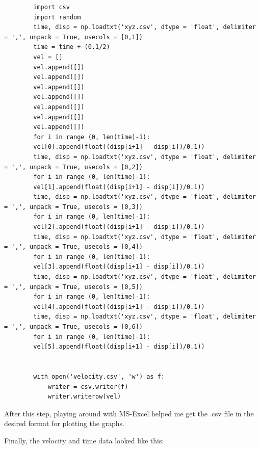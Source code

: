 \documentclass{article}
\begin{document}
	 \begin{lstlisting}
	 	import csv
	 	import random
	 	time, disp = np.loadtxt('xyz.csv', dtype = 'float', delimiter = ',', unpack = True, usecols = [0,1])
	 	time = time + (0.1/2)
	 	vel = []
	 	vel.append([])
	 	vel.append([])
	 	vel.append([])
	 	vel.append([])
	 	vel.append([])
	 	vel.append([])
	 	vel.append([])
	 	for i in range (0, len(time)-1):
	 	vel[0].append(float((disp[i+1] - disp[i])/0.1))
	 	time, disp = np.loadtxt('xyz.csv', dtype = 'float', delimiter = ',', unpack = True, usecols = [0,2])
	 	for i in range (0, len(time)-1):
	 	vel[1].append(float((disp[i+1] - disp[i])/0.1))
	 	time, disp = np.loadtxt('xyz.csv', dtype = 'float', delimiter = ',', unpack = True, usecols = [0,3])
	 	for i in range (0, len(time)-1):
	 	vel[2].append(float((disp[i+1] - disp[i])/0.1))
	 	time, disp = np.loadtxt('xyz.csv', dtype = 'float', delimiter = ',', unpack = True, usecols = [0,4])
	 	for i in range (0, len(time)-1):
	 	vel[3].append(float((disp[i+1] - disp[i])/0.1))
	 	time, disp = np.loadtxt('xyz.csv', dtype = 'float', delimiter = ',', unpack = True, usecols = [0,5])
	 	for i in range (0, len(time)-1):
	 	vel[4].append(float((disp[i+1] - disp[i])/0.1))
	 	time, disp = np.loadtxt('xyz.csv', dtype = 'float', delimiter = ',', unpack = True, usecols = [0,6])
	 	for i in range (0, len(time)-1):
	 	vel[5].append(float((disp[i+1] - disp[i])/0.1))
	 	
	 	
	 	with open('velocity.csv', 'w') as f:
	 	    writer = csv.writer(f)
	 	    writer.writerow(vel)
	 \end{lstlisting}
	 	
	 	After this step, playing around with MS-Excel helped me get the .csv file in the desired format for plotting the graphs.
	 	
	 	Finally, the velocity and time data looked like this:
	 	
\end{document}
